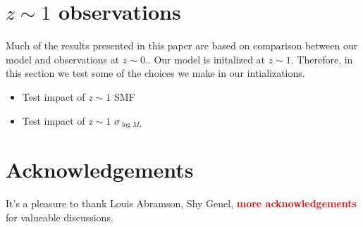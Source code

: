 \documentclass[12pt, letterpaper, preprint]{aastex}
\newcommand{\todo}[1]{{\bf \textcolor{red}{#1}}}
\newcommand{\bitem}{\begin{itemize}}
\newcommand{\eitem}{\end{itemize}}
\begin{document}
\appendix
\section{$z \sim 1$ observations} \label{app:z1}
Much of the results presented in this paper are based on comparison 
between our model and observations at $z \sim 0.$. Our model is initalized 
at $z \sim 1$. Therefore, in this section we test some of the choices 
we make in our intializations. 

\bitem
\item Test impact of $z \sim 1$ SMF
\item Test impact of $z \sim 1$ $\sigma_{\log M_*}$ 
\eitem

\section*{Acknowledgements}
It's a pleasure to thank 
    Louis Abramson, 
    Shy Genel, 
    \todo{more acknowledgements} 
for valueable discussions. 



\end{document}
